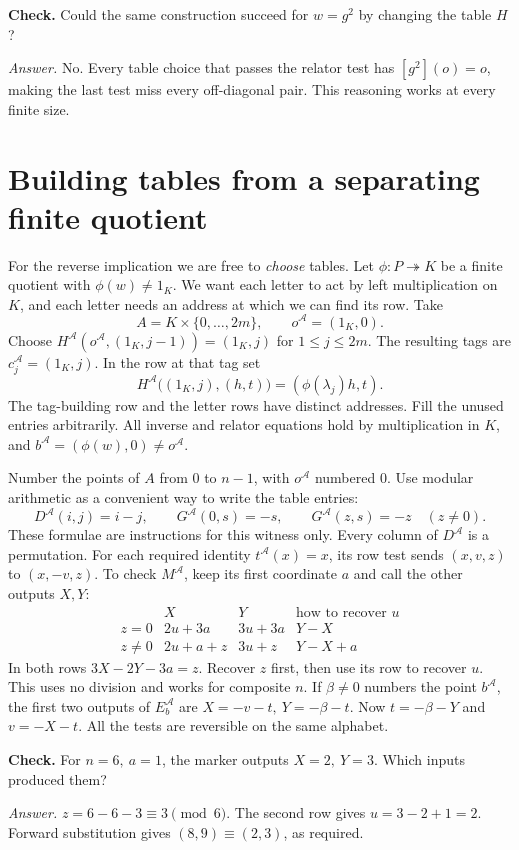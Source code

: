 \documentclass[a4paper,12pt]{article}
\newcommand{\fA}{\mathcal A}
\newcommand{\stephead}[1]{\par\smallskip{\large\bfseries\color{inkblue}#1}\par\nobreak}
\newcommand{\checkit}[1]{\par\smallskip\textbf{Check.} #1}
\newcommand{\answer}[1]{\par\textit{Answer.} #1}
\begin{document}
\checkit{Could the same construction succeed for \(w=g^2\) by changing the table \(H\)?}
\answer{No. Every table choice that passes the relator test has \([g^2](o)=o\), making the last test miss every off-diagonal pair. This reasoning works at every finite size.}
\newpage
\section{Building tables from a separating finite quotient}\label{witness}
For the reverse implication we are free to \emph{choose} tables. Let \(\phi:P\twoheadrightarrow K\) be a finite quotient with \(\phi(w)\ne1_K\). We want each letter to act by left multiplication on \(K\), and each letter needs an address at which we can find its row. Take
\[
 A=K\times\{0,\ldots,2m\},\qquad o^\fA=(1_K,0).
\]
Choose \(H^\fA(o^\fA,(1_K,j-1))=(1_K,j)\) for \(1\le j\le 2m\). The resulting tags are \(c_j^\fA=(1_K,j)\). In the row at that tag set
\[
 H^\fA\bigl((1_K,j),(h,t)\bigr)=(\phi(\lambda_j)h,t).
\]
The tag-building row and the letter rows have distinct addresses. Fill the unused entries arbitrarily. All inverse and relator equations hold by multiplication in \(K\), and \(b^\fA=(\phi(w),0)\ne o^\fA\).

\stephead{Tables that make each test reversible}
Number the points of \(A\) from \(0\) to \(n-1\), with \(o^\fA\) numbered \(0\). Use modular arithmetic as a convenient way to write the table entries:
\[
 D^\fA(i,j)=i-j,\qquad G^\fA(0,s)=-s,\qquad G^\fA(z,s)=-z\quad(z\ne0).
\]
These formulae are instructions for this witness only. Every column of \(D^\fA\) is a permutation. For each required identity \(t^\fA(x)=x\), its row test sends \((x,v,z)\) to \((x,-v,z)\). To check \(M^\fA\), keep its first coordinate \(a\) and call the other outputs \(X,Y\):
\[
\begin{array}{c|cc|l}
 &X&Y&\text{how to recover }u\\ \hline
 z=0&2u+3a&3u+3a&Y-X\\
 z\ne0&2u+a+z&3u+z&Y-X+a
\end{array}
\]
In both rows \(3X-2Y-3a=z\). Recover \(z\) first, then use its row to recover \(u\). This uses no division and works for composite \(n\). If \(\beta\ne0\) numbers the point \(b^\fA\), the first two outputs of \(E_b^\fA\) are \(X=-v-t,\ Y=-\beta-t\). Now \(t=-\beta-Y\) and \(v=-X-t\). All the tests are reversible on the same alphabet.

\checkit{For \(n=6,\ a=1\), the marker outputs \(X=2,\ Y=3\). Which inputs produced them?}
\answer{\(z=6-6-3\equiv3\pmod6\). The second row gives \(u=3-2+1=2\). Forward substitution gives \((8,9)\equiv(2,3)\), as required.}
\newpage
\end{document}

